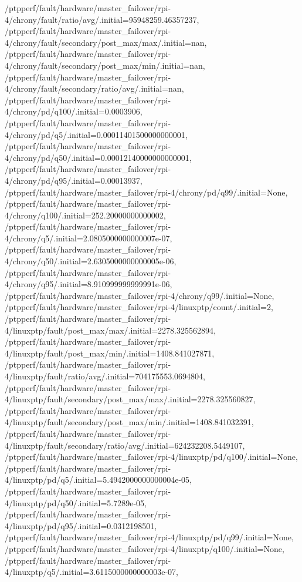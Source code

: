 {    /ptpperf/fault/hardware/master_failover/rpi-4/chrony/fault/ratio/avg/.initial=95948259.46357237,
    /ptpperf/fault/hardware/master_failover/rpi-4/chrony/fault/secondary/post_max/max/.initial=nan,
    /ptpperf/fault/hardware/master_failover/rpi-4/chrony/fault/secondary/post_max/min/.initial=nan,
    /ptpperf/fault/hardware/master_failover/rpi-4/chrony/fault/secondary/ratio/avg/.initial=nan,
    /ptpperf/fault/hardware/master_failover/rpi-4/chrony/pd/q100/.initial=0.0003906,
    /ptpperf/fault/hardware/master_failover/rpi-4/chrony/pd/q5/.initial=0.00011401500000000001,
    /ptpperf/fault/hardware/master_failover/rpi-4/chrony/pd/q50/.initial=0.00012140000000000001,
    /ptpperf/fault/hardware/master_failover/rpi-4/chrony/pd/q95/.initial=0.00013937,
    /ptpperf/fault/hardware/master_failover/rpi-4/chrony/pd/q99/.initial=None,
    /ptpperf/fault/hardware/master_failover/rpi-4/chrony/q100/.initial=252.20000000000002,
    /ptpperf/fault/hardware/master_failover/rpi-4/chrony/q5/.initial=2.0805000000000007e-07,
    /ptpperf/fault/hardware/master_failover/rpi-4/chrony/q50/.initial=2.6305000000000005e-06,
    /ptpperf/fault/hardware/master_failover/rpi-4/chrony/q95/.initial=8.910999999999991e-06,
    /ptpperf/fault/hardware/master_failover/rpi-4/chrony/q99/.initial=None,
    /ptpperf/fault/hardware/master_failover/rpi-4/linuxptp/count/.initial=2,
    /ptpperf/fault/hardware/master_failover/rpi-4/linuxptp/fault/post_max/max/.initial=2278.325562894,
    /ptpperf/fault/hardware/master_failover/rpi-4/linuxptp/fault/post_max/min/.initial=1408.841027871,
    /ptpperf/fault/hardware/master_failover/rpi-4/linuxptp/fault/ratio/avg/.initial=704175553.0694804,
    /ptpperf/fault/hardware/master_failover/rpi-4/linuxptp/fault/secondary/post_max/max/.initial=2278.325560827,
    /ptpperf/fault/hardware/master_failover/rpi-4/linuxptp/fault/secondary/post_max/min/.initial=1408.841032391,
    /ptpperf/fault/hardware/master_failover/rpi-4/linuxptp/fault/secondary/ratio/avg/.initial=624232208.5449107,
    /ptpperf/fault/hardware/master_failover/rpi-4/linuxptp/pd/q100/.initial=None,
    /ptpperf/fault/hardware/master_failover/rpi-4/linuxptp/pd/q5/.initial=5.4942000000000004e-05,
    /ptpperf/fault/hardware/master_failover/rpi-4/linuxptp/pd/q50/.initial=5.7289e-05,
    /ptpperf/fault/hardware/master_failover/rpi-4/linuxptp/pd/q95/.initial=0.0312198501,
    /ptpperf/fault/hardware/master_failover/rpi-4/linuxptp/pd/q99/.initial=None,
    /ptpperf/fault/hardware/master_failover/rpi-4/linuxptp/q100/.initial=None,
    /ptpperf/fault/hardware/master_failover/rpi-4/linuxptp/q5/.initial=3.6115000000000003e-07,
}
